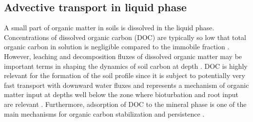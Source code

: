 \documentclass[11pt, oneside, a4paper]{article}   	%
\begin{document}


\subsection{Advective transport in liquid phase}
A small part of organic matter in soils is dissolved in the liquid phase. Concentrations of dissolved organic carbon (DOC) are typically so low that total organic
carbon in solution is negligible compared to the immobile fraction \citep{Michalzik2001}. However, leaching and decomposition fluxes of dissolved organic matter may
be important terms in shaping the dynamics of soil carbon at depth \citep{Neff2001, Kalbitz2008, Kindler2011, Kaiser2012}. DOC is highly relevant for the formation of the soil profile since it is subject to potentially very fast transport with downward water fluxes and represents a
mechanism of organic matter input at depths well below the zone where bioturbation and root input are relevant \citep{Rumpel2012}. Furthermore, adsorption of
DOC to the mineral phase is one of the main mechanisms for organic carbon stabilization and persistence \citep{Kalbitz2008}.
\end{document}
